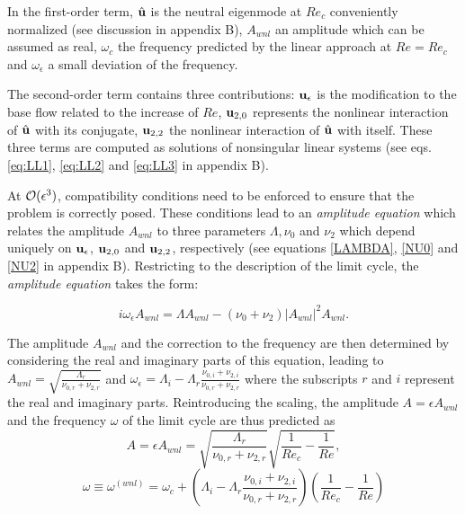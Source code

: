\documentclass[twocolumn,10pt]{asme2ej}
\newcommand{\be}[1]{ \begin{equation} \label{#1}}
\newcommand{\ee}{\end{equation}}
\begin{document}
In the first-order term, $\hat{\bf u}$ is the neutral eigenmode at $Re_c$ conveniently normalized (see discussion in appendix B), 
$A_{wnl}$ an amplitude which can be assumed as real, $\omega_c$ the frequency predicted by the linear approach at $Re=Re_c$ and $\omega_\epsilon$ a small deviation of the frequency. 

The second-order term contains three contributions: ${\bf u}_{\epsilon}$ is the modification to the base flow related to the increase of $Re$, ${\bf u}_{2,0}$ represents the nonlinear interaction of $\hat{\bf u}$ with its conjugate, ${\bf u}_{2,2}$ the nonlinear interaction of $\hat{\bf u}$ with itself.
These three terms are computed as solutions of nonsingular linear systems (see eqs. \eqref{eq:LL1}, \eqref{eq:LL2} and \eqref{eq:LL3} in appendix B).

At ${\cal O}( \epsilon ^3)$, compatibility conditions need to be enforced to ensure that the problem is correctly posed.
These conditions lead to an {\em amplitude equation} which relates the amplitude $ A_{wnl}$ to three parameters $\Lambda, \nu_{0}$ and $\nu_{2}$ which depend
uniquely on ${\bf u}_\epsilon$, ${\bf u}_{2,0}$ and ${\bf u}_{2,2}$, respectively (see equations \eqref{LAMBDA}, \eqref{NU0} and \eqref{NU2} in appendix B). Restricting to the description of the limit cycle, the {\em amplitude equation} takes the form:

\be{WNL3}
i \omega_\epsilon A_{wnl} = \Lambda A_{wnl} - (\nu_0+\nu_2)  |A_{wnl}|^2 A_{wnl}.
\ee


The amplitude $A_{wnl}$ and the correction to the frequency are then determined by considering the real and imaginary parts of this equation, leading to
$
A_{wnl}= \sqrt{ \frac{\Lambda_r}{\nu_{0,r}+\nu_{2,r}}}
$ and
$
\omega_\epsilon = \Lambda_i- \Lambda_r \frac{\nu_{0,i}+\nu_{2,i}}{\nu_{0,r}+\nu_{2,r}} 
$
where the subscripts $r$ and $i$ represent the real and imaginary parts.
Reintroducing the scaling, the  amplitude $A =  \epsilon A_{wnl} $ and the frequency $\omega$ of the limit cycle are thus predicted as
\be{ANL} 
A =  \epsilon A_{wnl} =\sqrt{ \frac{\Lambda_r}{\nu_{0,r}+\nu_{2,r} }} \sqrt{\frac{1}{Re_c}-\frac{1}{Re}},
\ee
\be{omegaWNL} 
\omega \equiv \omega^{(wnl)} =\omega_c+ \left( \Lambda_i- \Lambda_r \frac{\nu_{0,i}+\nu_{2,i}}{\nu_{0,r}+\nu_{2,r}} \right) \left(\frac{1}{Re_c}-\frac{1}{Re}\right)
\ee 
\end{document}
